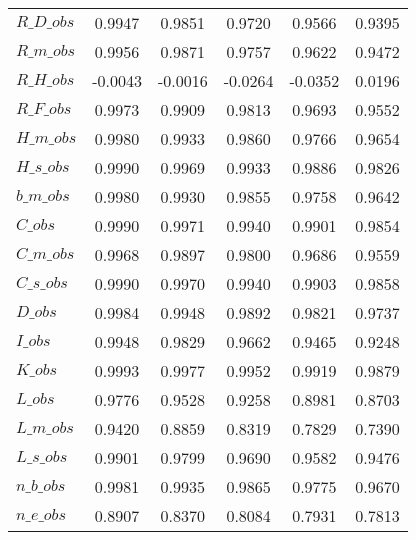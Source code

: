 \begin{center}
\begin{longtable}{lccccc}
$R\_D\_obs                  $	 & 	    0.9947	 & 	    0.9851	 & 	    0.9720	 & 	    0.9566	 & 	    0.9395 \\ 
$R\_m\_obs                  $	 & 	    0.9956	 & 	    0.9871	 & 	    0.9757	 & 	    0.9622	 & 	    0.9472 \\ 
$R\_H\_obs                  $	 & 	   -0.0043	 & 	   -0.0016	 & 	   -0.0264	 & 	   -0.0352	 & 	    0.0196 \\ 
$R\_F\_obs                  $	 & 	    0.9973	 & 	    0.9909	 & 	    0.9813	 & 	    0.9693	 & 	    0.9552 \\ 
$H\_m\_obs                  $	 & 	    0.9980	 & 	    0.9933	 & 	    0.9860	 & 	    0.9766	 & 	    0.9654 \\ 
$H\_s\_obs                  $	 & 	    0.9990	 & 	    0.9969	 & 	    0.9933	 & 	    0.9886	 & 	    0.9826 \\ 
$b\_m\_obs                  $	 & 	    0.9980	 & 	    0.9930	 & 	    0.9855	 & 	    0.9758	 & 	    0.9642 \\ 
$C\_obs                     $	 & 	    0.9990	 & 	    0.9971	 & 	    0.9940	 & 	    0.9901	 & 	    0.9854 \\ 
$C\_m\_obs                  $	 & 	    0.9968	 & 	    0.9897	 & 	    0.9800	 & 	    0.9686	 & 	    0.9559 \\ 
$C\_s\_obs                  $	 & 	    0.9990	 & 	    0.9970	 & 	    0.9940	 & 	    0.9903	 & 	    0.9858 \\ 
$D\_obs                     $	 & 	    0.9984	 & 	    0.9948	 & 	    0.9892	 & 	    0.9821	 & 	    0.9737 \\ 
$I\_obs                     $	 & 	    0.9948	 & 	    0.9829	 & 	    0.9662	 & 	    0.9465	 & 	    0.9248 \\ 
$K\_obs                     $	 & 	    0.9993	 & 	    0.9977	 & 	    0.9952	 & 	    0.9919	 & 	    0.9879 \\ 
$L\_obs                     $	 & 	    0.9776	 & 	    0.9528	 & 	    0.9258	 & 	    0.8981	 & 	    0.8703 \\ 
$L\_m\_obs                  $	 & 	    0.9420	 & 	    0.8859	 & 	    0.8319	 & 	    0.7829	 & 	    0.7390 \\ 
$L\_s\_obs                  $	 & 	    0.9901	 & 	    0.9799	 & 	    0.9690	 & 	    0.9582	 & 	    0.9476 \\ 
$n\_b\_obs                  $	 & 	    0.9981	 & 	    0.9935	 & 	    0.9865	 & 	    0.9775	 & 	    0.9670 \\ 
$n\_e\_obs                  $	 & 	    0.8907	 & 	    0.8370	 & 	    0.8084	 & 	    0.7931	 & 	    0.7813 \\ 

\end{longtable}
\end{center}
